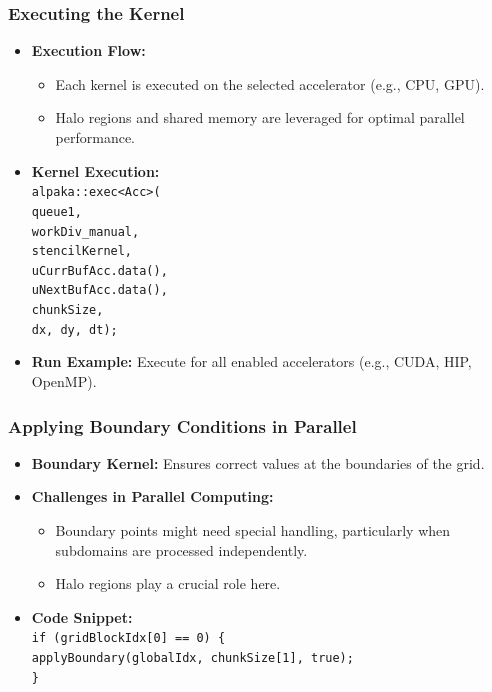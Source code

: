 \documentclass[9pt]{beamer}
\begin{document}
\begin{frame}
\frametitle{Executing the Kernel}
\begin{itemize}
    \item \textbf{Execution Flow:}
    \begin{itemize}
        \item Each kernel is executed on the selected accelerator (e.g., CPU, GPU).
        \item Halo regions and shared memory are leveraged for optimal parallel performance.
    \end{itemize}
    \item \textbf{Kernel Execution:} \\
    \texttt{alpaka::exec<Acc>(} \\
    \texttt{queue1,} \\
    \texttt{workDiv\_manual,} \\
    \texttt{stencilKernel,} \\
    \texttt{uCurrBufAcc.data(),} \\
    \texttt{uNextBufAcc.data(),} \\
    \texttt{chunkSize,} \\
    \texttt{dx, dy, dt);} \\
    \item \textbf{Run Example:} Execute for all enabled accelerators (e.g., CUDA, HIP, OpenMP).
\end{itemize}
\end{frame}


\begin{frame}
\frametitle{Applying Boundary Conditions in Parallel}
\begin{itemize}
    \item \textbf{Boundary Kernel:} Ensures correct values at the boundaries of the grid.
    \item \textbf{Challenges in Parallel Computing:}
    \begin{itemize}
        \item Boundary points might need special handling, particularly when subdomains are processed independently.
        \item Halo regions play a crucial role here.
    \end{itemize}
    \item \textbf{Code Snippet:} \\
    \texttt{if (gridBlockIdx[0] == 0) \{} \\
    \texttt{applyBoundary(globalIdx, chunkSize[1], true);} \\
    \texttt{\}}
\end{itemize}
\end{frame}
\end{document}
